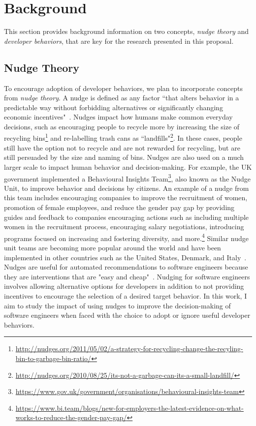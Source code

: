 \section{Background}

This section provides background information on two concepts, \textit{nudge theory} and \textit{developer behaviors}, that are key for the research presented in this proposal.

\subsection{Nudge Theory}

To encourage adoption of developer behaviors, we plan to incorporate concepts from \textit{nudge theory}. A nudge is defined as any factor ``that alters behavior in a predictable way without forbidding alternatives or significantly changing economic incentives"~\cite[p.~6]{sunstein2008nudge}. Nudges impact how humans make common everyday decisions, such as encouraging people to recycle more by increasing the size of recycling bins\footnote{\url{http://nudges.org/2011/05/02/a-strategy-for-recycling-change-the-recyling-bin-to-garbage-bin-ratio/}} and re-labelling trash cans as ``landfills"\footnote{\url{http://nudges.org/2010/08/25/its-not-a-garbage-can-its-a-small-landfill/}}. In these cases, people still have the option not to recycle and are not rewarded for recycling, but are still persuaded by the size and naming of bins. Nudges are also used on a much larger scale to impact human behavior and decision-making. For example, the UK government implemented a Behavioural Insights Team\footnote{\url{https://www.gov.uk/government/organisations/behavioural-insights-team}}, also known as the Nudge Unit, to improve behavior and decisions by citizens. An example of a nudge from this team includes encouraging companies to improve the recruitment of women, promotion of female employees, and reduce the gender pay gap by providing guides and feedback to companies encouraging actions such as including multiple women in the recruitment process, encouraging salary negotiations, introducing programs focused on increasing and fostering diversity, and more.\footnote{\url{https://www.bi.team/blogs/new-for-employers-the-latest-evidence-on-what-works-to-reduce-the-gender-pay-gap/}} Similar nudge unit teams are becoming more popular around the world and have been implemented in other countries such as the United States, Denmark, and Italy~\cite{DelBalzoNudging}. Nudges are useful for automated recommendations to software engineers because they are interventions that are "easy and cheap"~\cite[p.~6]{sunstein2008nudge}. Nudging for software engineers involves allowing alternative options for developers in addition to not providing incentives to encourage the selection of a desired target behavior. In this work, I aim to study the impact of using nudges to improve the decision-making of software engineers when faced with the choice to adopt or ignore useful developer behaviors.


